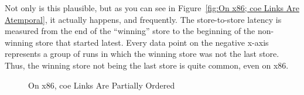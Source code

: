 \documentclass[10]{article}
\begin{document}
Not only is this plausible, but as you can see in
Figure~\ref{fig:On x86; coe Links Are Atemporal},
it actually happens, and frequently.
The store-to-store latency is measured from the end of the ``winning''
store to the beginning of the non-winning store that started latest.
Every data point on the negative x-axis represents a group of runs
in which the winning store was not the last store.
Thus, the winning store not being the last store is quite common, even
on x86.

\begin{figure}[tb]
\begin{center}
\caption{On x86, coe Links Are Partially Ordered}
\label{fig:On x86, coe Links Are Partially Ordered}
\end{center}
\end{figure}
\end{document}
